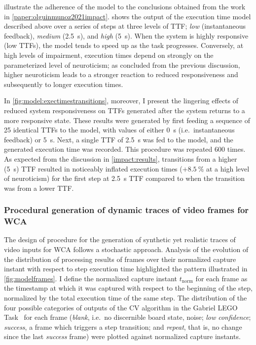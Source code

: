  illustrate the adherence of the model to the conclusions obtained from the work in \cref{paper:olguinmunoz2021impact}.
 shows the output of the execution time model described above over a series of steps at three levels of \gls{TTF};
\emph{low} (instantaneous feedback), \emph{medium} (\SI{2.5}{\second}), and \emph{high} (\SI{5}{\second}).
When the system is highly responsive (low \glspl{TTF}), the model tends to speed up as the task progresses.
Conversely, at high levels of impairment, execution times depend on strongly on the parameterized level of neuroticism;
as concluded from the previous discussion, higher neuroticism leads to a stronger reaction to reduced responsiveness and subsequently to longer execution times.

In \cref{fig:model:exectimestransitions}, moreover, I present the lingering effects of reduced system responsiveness on \glspl{TTF} generated after the system returns to a more responsive state.
These results were generated by first feeding a sequence of \num{25} identical \glspl{TTF} to the model, with values of either \SI{0}{\second} (i.e.\ instantaneous feedback) or \SI{5}{\second}.
Next, a single \gls{TTF} of \SI{2.5}{\second} was fed to the model, and the generated execution time was recorded.
This procedure was repeated \num{600} times.
As expected from the discussion in \cref{impact:results}, transitions from a higher (\SI{5}{\second}) \gls{TTF} resulted in noticeably inflated execution times (\ensuremath{+\SI{8.5}{\percent}} at a high level of neuroticism) for the first step at \SI{2.5}{\second} \gls{TTF} compared to when the transition was from a lower \gls{TTF}.

\subsubsection{Procedural generation of dynamic traces of video frames for \acs{WCA}}\label{model:traces}

The design of procedure for the generation of synthetic yet realistic traces of video inputs for \gls{WCA} follows a stochastic approach.
Analysis of the evolution of the distribution of processing results of frames over their normalized capture instant with respect to step execution time highlighted the pattern illustrated in \cref{fig:modelframes}.
I define the normalized capture instant \ensuremath{t_\text{norm}} for each frame as the timestamp at which it was captured with respect to the beginning of the step, normalized by the total execution time of the same step.
The distribution of the four possible categories of outputs of the \gls{CV} algorithm in the Gabriel LEGO Task~\cite{chen2018application} for each frame (\emph{blank}, i.e.\ no discernible board state, noise; \emph{low confidence}; \emph{success}, a frame which triggers a step transition;
and \emph{repeat}, that is, no change since the last \emph{success} frame) were plotted against normalized capture instants.

